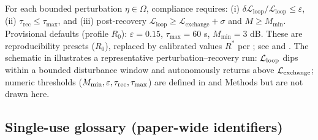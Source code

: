\documentclass[11pt]{article}
\begin{document}
For each bounded perturbation $\eta \in \Omega$, compliance requires: (i) $\delta\mathcal{L}_{\text{loop}}/\mathcal{L}_{\text{loop}} \leq \varepsilon$, (ii) $\tau_{\text{rec}} \leq \tau_{\max}$, and (iii) post-recovery $\mathcal{L}_{\text{loop}} \geq \mathcal{L}_{\text{exchange}} + \sigma$ and $M \geq M_{\min}$. Provisional defaults (profile $R_0$): $\varepsilon = 0.15$, $\tau_{\max} = 60$ s, $M_{\min} = 3$ dB. These are reproducibility presets ($R_0$), replaced by calibrated values $R^*$ per ; see  and . The schematic in  illustrates a representative perturbation–recovery run: $\mathcal{L}_{\text{loop}}$ dips within a bounded disturbance window and autonomously returns above $\mathcal{L}_{\text{exchange}}$; numeric thresholds ($M_{\min}, \varepsilon, \tau_{\text{rec}}, \tau_{\max}$) are defined in  and Methods  but are not drawn here.


\subsection{Single-use glossary (paper-wide identifiers)}
\label{sec:glossary}
\end{document}
